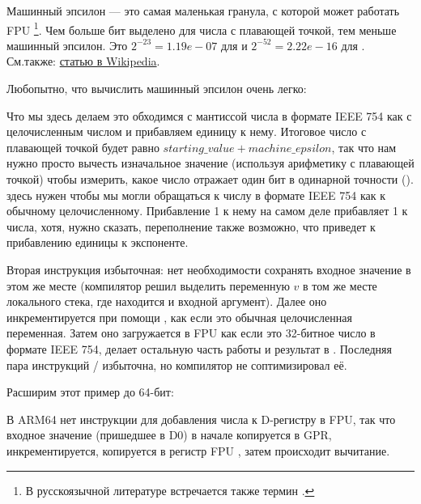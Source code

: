 ﻿

Машинный эпсилон --- это самая маленькая гранула, с которой может работать \ac{FPU} 
\footnote{В русскоязычной литературе встречается также термин .}.
Чем больше бит выделено для числа с плавающей точкой, тем меньше машинный эпсилон.
Это $2^{-23} = 1.19e-07$ для \Tfloat и $2^{-52} = 2.22e-16$ для \Tdouble.
См.также: \href{http://link.yurichev.com/17368}{статью в Wikipedia}.

Любопытно, что вычислить машинный эпсилон очень легко:



Что мы здесь делаем это обходимся с мантиссой числа в формате IEEE 754 как с целочисленным числом и прибавляем
единицу к нему.
Итоговое число с плавающей точкой будет равно $starting\_value+machine\_epsilon$, так что нам
нужно просто вычесть изначальное значение (используя арифметику с плавающей точкой) чтобы измерить, 
какое число отражает один бит в одинарной точности (\Tfloat).
 здесь нужен чтобы мы могли обращаться к числу в формате IEEE 754 как к обычному целочисленному.
Прибавление 1 к нему на самом деле прибавляет 1 к  числа, хотя, нужно сказать,
переполнение также возможно, что приведет к прибавлению единицы к экспоненте.




Вторая инструкция  избыточная: нет необходимости сохранять входное значение в этом же месте
(компилятор решил выделить переменную $v$ в том же месте локального стека, где находится и 
входной аргумент).
Далее оно инкрементируется при помощи , как если это обычная целочисленная переменная.
Затем оно загружается в FPU как если это 32-битное число в формате IEEE 754,  делает остальную
часть работы и результат в .
Последняя пара инструкций / избыточна, но компилятор не соптимизировал её.


Расширим этот пример до 64-бит:



В ARM64 нет инструкции для добавления числа к D-регистру в FPU, так что входное значение
(пришедшее в D0) в начале копируется в \ac{GPR},
инкрементируется, копируется в регистр FPU , затем происходит вычитание.

